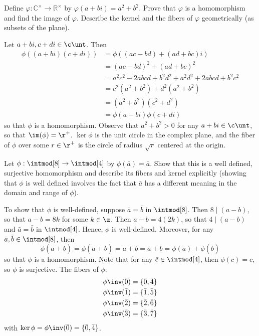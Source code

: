 \newpage

\begin{exercise}\label{ex3.1.9}
    Define $\varphi : \mathbb{C}^{\times} \to \mathbb{R}^{\times}$ by $\varphi(a+bi) = a^2 + b^2$. Prove that $\varphi$ is a homomorphism and find the image of $\varphi$. Describe the kernel and the fibers of $\varphi$ geometrically (as subsets of the plane).
\end{exercise}

\begin{sol}
    Let $a + bi, c + di \in \c\unt$. Then
    \begin{align*}
        \phi((a + bi)(c + di)) & = \phi((ac - bd) + (ad + bc)i) \\
        & = (ac - bd)^2 + (ad + bc)^2 \\
        & = a^2c^2 - 2abcd + b^2d^2 + a^2d^2 + 2abcd + b^2c^2 \\
        & = c^2(a^2 + b^2) + d^2(a^2 + b^2) \\
        & = (a^2 + b^2)(c^2 + d^2) \\
        & = \phi(a + bi)\phi(c + di)
    \end{align*}
    so that $\phi$ is a homomorphism. Observe that $a^2 + b^2 > 0$ for any $a + bi \in \c\unt$, so that $\im(\phi) = \r^+$. $\ker\phi$ is the unit circle in the complex plane, and the fiber of $\phi$ over some $r \in \r^+$ is the circle of radius $\sqrt r$ centered at the origin.
\end{sol}

\begin{exercise}\label{ex3.1.10}
    Let $\phi : \intmod[8] \to \intmod[4]$ by $\phi(\bar  a) = \bar  a$. Show that this is a well defined, surjective homomorphism and describe its fibers and kernel explicitly (showing that $\phi$ is well defined involves the fact that $\bar  a$ has a different meaning in the domain and range of $\phi$).
\end{exercise}

\begin{sol}
    To show that $\phi$ is well-defined, suppose $\bar a = \bar b$ in $\intmod[8]$. Then $8 \mid (a - b)$, so that $a - b = 8k$ for some $k \in \z$. Then $a - b = 4(2k)$, so that $4 \mid (a - b)$ and $\bar a = \bar b$ in $\intmod[4]$. Hence, $\phi$ is well-defined. Moreover, for any $\bar a, \bar b \in \intmod[8]$, then
    \[\phi(\bar a + \bar b) = \phi(\overline{a + b}) = \overline{a + b} = \bar a + \bar b = \phi(\bar a) + \phi(\bar b)\]
    so that $\phi$ is a homomorphism. Note that for any $\bar c \in \intmod[4]$, then $\phi(\bar c) = \bar c$, so $\phi$ is surjective. The fibers of $\phi$:
    \begin{align*}
        \phi\inv(\bar 0) & = \{\bar 0, \bar 4\} \\
        \phi\inv(\bar 1) & = \{\bar 1, \bar 5\} \\
        \phi\inv(\bar 2) & = \{\bar 2, \bar 6\} \\
        \phi\inv(\bar 3) & = \{\bar 3, \bar 7\}
    \end{align*}
    with $\ker\phi = \phi\inv(\bar 0) = \{\bar 0, \bar 4\}$.
\end{sol}

